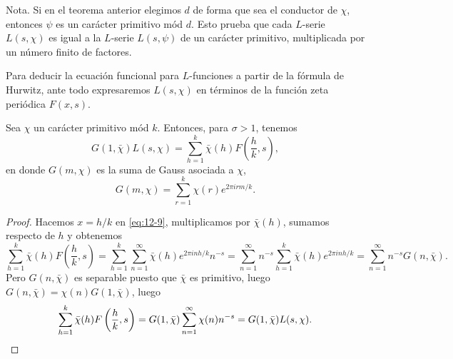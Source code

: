 \documentclass[12pt,a4paper]{book}
\begin{document}
    Nota. Si en el teorema anterior elegimos $d$ de forma que sea el conductor de $\chi$,
    entonces $\psi$ es un carácter primitivo mód $d$. Esto prueba que cada $L$-serie
    $L(s,\chi)$ es igual a la $L$-serie $L(s,\psi)$ de un carácter primitivo, multiplicada por
    un número finito de factores.

    Para deducir la ecuación funcional para $L$-funciones a partir de la fórmula de Hurwitz,
    ante todo expresaremos $L(s,\chi)$ en términos de la función zeta periódica $F(x,s)$.

    \begin{teorema}\label{teo:12-10}
        Sea $\chi$ un carácter primitivo mód $k$. Entonces, para $\sigma>1$, tenemos
        \begin{equation}\label{eq:12-15}
            G(1,\bar{\chi})L(s,\chi)=\sum_{h=1}^{k}\bar{\chi}(h)F\left(\frac{h}{k},s\right),
        \end{equation}
        en donde $G(m,\chi)$ es la suma de Gauss asociada a $\chi$,
        \begin{equation*}
            G(m,\chi)=\sum_{r=1}^{k}\chi(r)e^{2\pi irm/k}.
        \end{equation*}
    \end{teorema}

    \begin{proof}
        Hacemos $x=h/k$ en \eqref{eq:12-9}, multiplicamos por $\bar{\chi}(h)$, sumamos respecto
        de $h$ y obtenemos
        \begin{equation*}
            \sum_{h=1}^{k}\bar{\chi}(h)F\left(\frac{h}{k},s\right)=\sum_{h=1}^{k}\sum_{n=1}^{\infty}\bar{\chi}(h)e^{2\pi inh/k}n^{-s}=\sum_{n=1}^{\infty}n^{-s}\sum_{h=1}^{k}\bar{\chi}(h)e^{2\pi inh/k}=\sum_{n=1}^{\infty}n^{-s}G(n,\bar{\chi}).
        \end{equation*}
        Pero $G(n,\bar{\chi})$ es separable puesto que $\bar{\chi}$ es primitivo, luego
        $G(n,\bar{\chi})=\chi(n)G(1,\bar{\chi})$, luego
        \begin{equation*}
            \sum_{h=1}^{k}\bar{\chi}(h)F\left(\frac{h}{k},s\right)=G(1,\bar{\chi})\sum_{n=1}^{\infty}\chi(n)n^{-s}=G(1,\bar{\chi})L(s,\chi).\qedhere
        \end{equation*}
    \end{proof}
\end{document}
